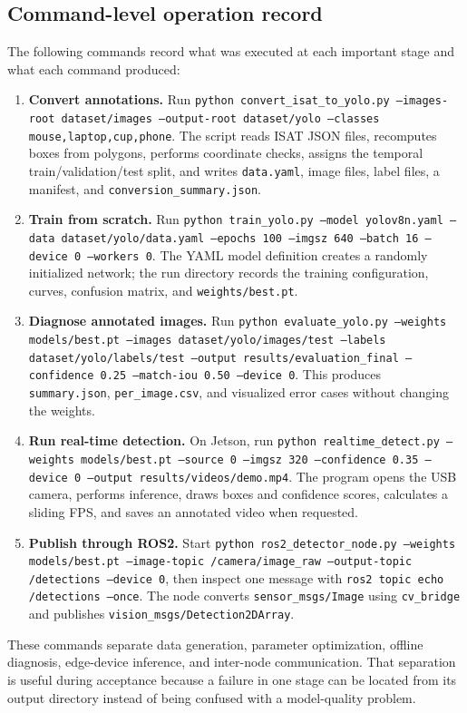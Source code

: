 \documentclass[11pt,conference,a4paper]{IEEEtran}
\newcommand{\code}[1]{\texttt{\footnotesize #1}}
\begin{document}
\subsection{Command-level operation record}
The following commands record what was executed at each important stage and what each command produced:
\begin{enumerate}
\raggedright
\item \textbf{Convert annotations.} Run \code{python convert\_isat\_to\_yolo.py --images-root dataset/images --output-root dataset/yolo --classes mouse,laptop,cup,phone}. The script reads ISAT JSON files, recomputes boxes from polygons, performs coordinate checks, assigns the temporal train/validation/test split, and writes \code{data.yaml}, image files, label files, a manifest, and \code{conversion\_summary.json}.
\item \textbf{Train from scratch.} Run \code{python train\_yolo.py --model yolov8n.yaml --data dataset/yolo/data.yaml --epochs 100 --imgsz 640 --batch 16 --device 0 --workers 0}. The YAML model definition creates a randomly initialized network; the run directory records the training configuration, curves, confusion matrix, and \code{weights/best.pt}.
\item \textbf{Diagnose annotated images.} Run \code{python evaluate\_yolo.py --weights models/best.pt --images dataset/yolo/images/test --labels dataset/yolo/labels/test --output results/evaluation\_final --confidence 0.25 --match-iou 0.50 --device 0}. This produces \code{summary.json}, \code{per\_image.csv}, and visualized error cases without changing the weights.
\item \textbf{Run real-time detection.} On Jetson, run \code{python realtime\_detect.py --weights models/best.pt --source 0 --imgsz 320 --confidence 0.35 --device 0 --output results/videos/demo.mp4}. The program opens the USB camera, performs inference, draws boxes and confidence scores, calculates a sliding FPS, and saves an annotated video when requested.
\item \textbf{Publish through ROS2.} Start \code{python ros2\_detector\_node.py --weights models/best.pt --image-topic /camera/image\_raw --output-topic /detections --device 0}, then inspect one message with \code{ros2 topic echo /detections --once}. The node converts \code{sensor\_msgs/Image} using \code{cv\_bridge} and publishes \code{vision\_msgs/Detection2DArray}.
\end{enumerate}
These commands separate data generation, parameter optimization, offline diagnosis, edge-device inference, and inter-node communication. That separation is useful during acceptance because a failure in one stage can be located from its output directory instead of being confused with a model-quality problem.
\end{document}

